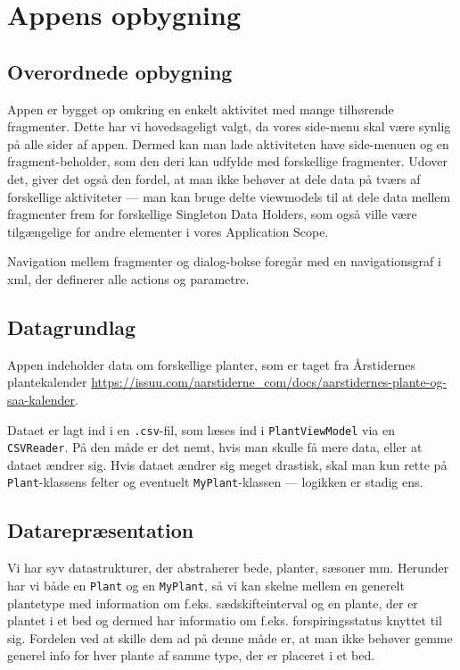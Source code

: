 \section{Appens opbygning}

\subsection{Overordnede opbygning}
Appen er bygget op omkring en enkelt aktivitet med mange tilhørende fragmenter. Dette har vi hovedsageligt valgt, da vores side-menu skal være synlig på alle sider af appen. Dermed kan man lade aktiviteten have side-menuen og en fragment-beholder, som den deri kan udfylde med forskellige fragmenter. Udover det, giver det også den fordel, at man ikke behøver at dele data på tværs af forskellige aktiviteter --- man kan bruge delte viewmodels til at dele data mellem fragmenter frem for forskellige Singleton Data Holders, som også ville være tilgængelige for andre elementer i vores Application Scope.

Navigation mellem fragmenter og dialog-bokse foregår med en navigationsgraf i xml, der definerer alle actions og parametre.

\subsection{Datagrundlag}
Appen indeholder data om forskellige planter, som er taget fra Årstidernes plantekalender \hyperlink{https://issuu.com/aarstiderne\_com/docs/aarstidernes-plante-og-saa-kalender}{https://issuu.com/aarstiderne\_com/docs/aarstidernes-plante-og-saa-kalender}.

Dataet er lagt ind i en \texttt{.csv}-fil, som læses ind i \texttt{PlantViewModel} via en \texttt{CSVReader}. På den måde er det nemt, hvis man skulle få mere data, eller at dataet ændrer sig. Hvis dataet ændrer sig meget drastisk, skal man kun rette på \texttt{Plant}-klassens felter og eventuelt \texttt{MyPlant}-klassen --- logikken er stadig ens.

\subsection{Datarepræsentation}

Vi har syv datastrukturer, der abstraherer bede, planter, sæsoner mm. Herunder har vi både en \texttt{Plant} og en \texttt{MyPlant}, så vi kan skelne mellem en generelt plantetype med information om f.eks. sædskifteinterval og en plante, der er plantet i et bed og dermed har informatio om f.eks. forspiringsstatus knyttet til sig. Fordelen ved at skille dem ad på denne måde er, at man ikke behøver gemme generel info for hver plante af samme type, der er placeret i et bed.

